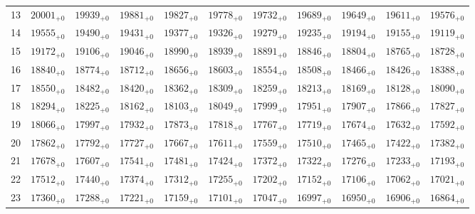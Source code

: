 \documentclass[10pt, a4paper]{article}
\begin{document}
\begin{center}
\begin{tabular}{c || c c c c c | c c c c c}
        13 & \({20001}_{+0}\) & \({19939}_{+0}\) & \({19881}_{+0}\) & \({19827}_{+0}\) & \({19778}_{+0}\) & \({19732}_{+0}\) & \({19689}_{+0}\) & \({19649}_{+0}\) & \({19611}_{+0}\) & \({19576}_{+0}\)\\
        14 & \({19555}_{+0}\) & \({19490}_{+0}\) & \({19431}_{+0}\) & \({19377}_{+0}\) & \({19326}_{+0}\) & \({19279}_{+0}\) & \({19235}_{+0}\) & \({19194}_{+0}\) & \({19155}_{+0}\) & \({19119}_{+0}\)\\
        15 & \({19172}_{+0}\) & \({19106}_{+0}\) & \({19046}_{+0}\) & \({18990}_{+0}\) & \({18939}_{+0}\) & \({18891}_{+0}\) & \({18846}_{+0}\) & \({18804}_{+0}\) & \({18765}_{+0}\) & \({18728}_{+0}\)\\
        \hline
        16 & \({18840}_{+0}\) & \({18774}_{+0}\) & \({18712}_{+0}\) & \({18656}_{+0}\) & \({18603}_{+0}\) & \({18554}_{+0}\) & \({18508}_{+0}\) & \({18466}_{+0}\) & \({18426}_{+0}\) & \({18388}_{+0}\)\\
        17 & \({18550}_{+0}\) & \({18482}_{+0}\) & \({18420}_{+0}\) & \({18362}_{+0}\) & \({18309}_{+0}\) & \({18259}_{+0}\) & \({18213}_{+0}\) & \({18169}_{+0}\) & \({18128}_{+0}\) & \({18090}_{+0}\)\\
        18 & \({18294}_{+0}\) & \({18225}_{+0}\) & \({18162}_{+0}\) & \({18103}_{+0}\) & \({18049}_{+0}\) & \({17999}_{+0}\) & \({17951}_{+0}\) & \({17907}_{+0}\) & \({17866}_{+0}\) & \({17827}_{+0}\)\\
        19 & \({18066}_{+0}\) & \({17997}_{+0}\) & \({17932}_{+0}\) & \({17873}_{+0}\) & \({17818}_{+0}\) & \({17767}_{+0}\) & \({17719}_{+0}\) & \({17674}_{+0}\) & \({17632}_{+0}\) & \({17592}_{+0}\)\\
        20 & \({17862}_{+0}\) & \({17792}_{+0}\) & \({17727}_{+0}\) & \({17667}_{+0}\) & \({17611}_{+0}\) & \({17559}_{+0}\) & \({17510}_{+0}\) & \({17465}_{+0}\) & \({17422}_{+0}\) & \({17382}_{+0}\)\\
        \hline
        21 & \({17678}_{+0}\) & \({17607}_{+0}\) & \({17541}_{+0}\) & \({17481}_{+0}\) & \({17424}_{+0}\) & \({17372}_{+0}\) & \({17322}_{+0}\) & \({17276}_{+0}\) & \({17233}_{+0}\) & \({17193}_{+0}\)\\
        22 & \({17512}_{+0}\) & \({17440}_{+0}\) & \({17374}_{+0}\) & \({17312}_{+0}\) & \({17255}_{+0}\) & \({17202}_{+0}\) & \({17152}_{+0}\) & \({17106}_{+0}\) & \({17062}_{+0}\) & \({17021}_{+0}\)\\
        23 & \({17360}_{+0}\) & \({17288}_{+0}\) & \({17221}_{+0}\) & \({17159}_{+0}\) & \({17101}_{+0}\) & \({17047}_{+0}\) & \({16997}_{+0}\) & \({16950}_{+0}\) & \({16906}_{+0}\) & \({16864}_{+0}\)\\

\end{tabular}
\end{center}
\end{document}

